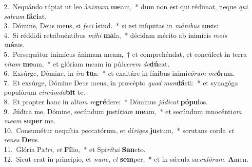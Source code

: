 {2.~}Nequándo rápiat ut leo á\textit{ni}\textit{mam} \textbf{me}am,~* dum non est qui rédimat, neque \textit{qui} \textit{sal}\textit{vum} \textbf{fá}\textbf{ci}at.\\
{3.~}Dómine, Deus meus, si \textit{fe}\textit{ci} \textbf{i}stud.~* si est iníquitas in \textit{má}\textit{ni}\textit{bus} \textbf{me}is:\\
{4.~}Si réddidi retribuéntibus \textit{mi}\textit{hi} \textbf{ma}la,~* décidam mérito ab inimícis \textit{me}\textit{is} \textit{i}\textbf{ná}nis.\\
{5.~}Persequátur inimícus ánimam meam,~† et comprehéndat, et concúlcet in terra \textit{vi}\textit{tam} \textbf{me}am,~* et glóriam meam in púl\textit{ve}\textit{rem} \textit{de}\textbf{dú}cat.\\
{6.~}Exsúrge, Dómine, in \textit{i}\textit{ra} \textbf{tu}a:~* et exaltáre in fínibus inimi\textit{có}\textit{rum} \textit{me}\textbf{ó}rum.\\
{7.~}Et exsúrge, Dómine Deus meus, in præcépto \textit{quod} \textit{man}\textbf{dá}sti:~* et synagóga populórum \textit{cir}\textit{cúm}\textit{da}\textbf{bit} te.\\
{8.~}Et propter hanc in al\textit{tum} \textit{re}\textbf{gré}dere:~* Dóminus \textit{jú}\textit{di}\textit{cat} \textbf{pó}\textbf{pu}los.\\
{9.~}Júdica me, Dómine, secúndum justí\textit{ti}\textit{am} \textbf{me}am,~* et secúndum innocénti\textit{am} \textit{me}\textit{am} \textbf{su}\textbf{per} me.\\
{10.~}Consumétur nequítia peccatórum, et dí\textit{ri}\textit{ges} \textbf{ju}stum,~* scrutans corda \textit{et} \textit{re}\textit{nes} \textbf{De}us.\\
{11.~}Glória Pa\textit{tri}, \textit{et} \textbf{Fí}lio,~* et Spi\textit{rí}\textit{tu}\textit{i} \textbf{San}cto.\\
{12.~}Sicut erat in princípio, et \textit{nunc}, \textit{et} \textbf{sem}per,~* et in sǽcula sæ\textit{cu}\textit{ló}\textit{rum}. \textbf{A}men.\\
